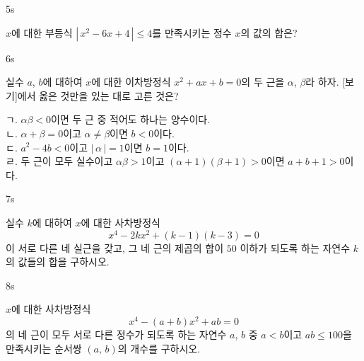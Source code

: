 \documentclass[10pt]{article}
\begin{document}
\begin{pagepair}

\begin{problem}{5}{s}
\par\smallskip
$x$에 대한 부등식 $|\,x^2 - 6x + 4\,| \le 4$를 만족시키는 정수 $x$의 값의 합은?
\begin{choices}
\end{choices}
\end{problem}

\begin{problem}{6}{s}
\par\smallskip
실수 $a$, $b$에 대하여 $x$에 대한 이차방정식 $x^2 + ax + b = 0$의 두 근을 $\alpha$, $\beta$라 하자. [보기]에서 옳은 것만을 있는 대로 고른 것은?
\begin{conditions}
ㄱ. $\alpha\beta < 0$이면 두 근 중 적어도 하나는 양수이다. \\
ㄴ. $\alpha + \beta = 0$이고 $\alpha \ne \beta$이면 $b < 0$이다. \\
ㄷ. $a^2 - 4b < 0$이고 $|\,\alpha\,| = 1$이면 $b = 1$이다. \\
ㄹ. 두 근이 모두 실수이고 $\alpha\beta > 1$이고 $(\alpha + 1)(\beta + 1) > 0$이면 $a + b + 1 > 0$이다.
\end{conditions}
\begin{choices}
\end{choices}
\end{problem}

\end{pagepair}


\begin{pagepair}

\begin{problem}{7}{s}
\par\smallskip
실수 $k$에 대하여 $x$에 대한 사차방정식
$$x^4 - 2kx^2 + (k - 1)(k - 3) = 0$$
이 서로 다른 네 실근을 갖고, 그 네 근의 제곱의 합이 $50$ 이하가 되도록 하는 자연수 $k$의 값들의 합을 구하시오.
\end{problem}

\begin{problem}{8}{s}
\par\smallskip
$x$에 대한 사차방정식
$$x^4 - (a + b)x^2 + ab = 0$$
의 네 근이 모두 서로 다른 정수가 되도록 하는 자연수 $a$, $b$ 중 $a < b$이고 $ab \le 100$을 만족시키는 순서쌍 $(a,\,b)$의 개수를 구하시오.
\end{problem}

\end{pagepair}
\end{document}
